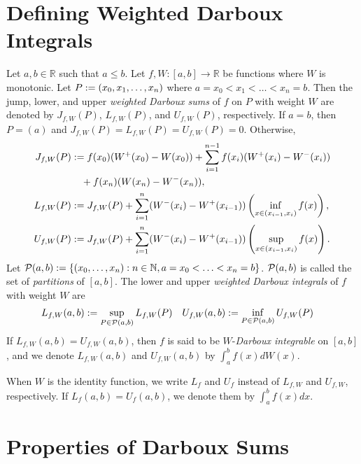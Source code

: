 \documentclass[a4paper,12pt,fleqn]{article}
\begin{document}
\section{Defining Weighted Darboux Integrals}

\begin{definition}
\label{defn:darboux-integral}
Let $a, b \in \mathbb{R}$ such that $a \le b$.
Let $f, W: [a, b] \to \mathbb{R}$ be functions where $W$ is monotonic.
Let $P := (x_0, x_1, \ldots, x_n)$ where $a = x_0 < x_1 < \ldots < x_n = b$.
Then the jump, lower, and upper \emph{weighted Darboux sums} of $f$ on $P$ with weight $W$
are denoted by $J_{f,W}(P)$, $L_{f,W}(P)$, and $U_{f,W}(P)$, respectively.
If $a = b$, then $P = (a)$ and $J_{f,W}(P) = L_{f,W}(P) = U_{f,W}(P) = 0$. Otherwise,
\begin{align*}
J_{f,W}(P) &:= f(x_0)(W^+(x_0) - W(x_0))
    + \sum_{i=1}^{n-1} f(x_i)(W^+(x_i) - W^-(x_i))
    \\ &\quad + f(x_n)(W(x_n) - W^-(x_n)),
\\ L_{f,W}(P) &:= J_{f,W}(P)
    + \sum_{i=1}^n (W^-(x_i) - W^+(x_{i-1}))\left(\inf_{x \in (x_{i-1}, x_i)} f(x)\right),
\\ U_{f,W}(P) &:= J_{f,W}(P)
    + \sum_{i=1}^n (W^-(x_i) - W^+(x_{i-1}))\left(\sup_{x \in (x_{i-1}, x_i)} f(x)\right).
\end{align*}
Let $\mathcal{P}(a, b) := \{(x_0, \ldots, x_n): n \in \mathbb{N}, a = x_0 < \ldots < x_n = b\}$.
$\mathcal{P}(a, b)$ is called the set of \emph{partitions} of $[a, b]$.
The lower and upper \emph{weighted Darboux integrals} of $f$ with weight $W$ are
\begin{align*}
L_{f,W}(a, b) &:= \sup_{P \in \mathcal{P}(a, b)} L_{f,W}(P)
& U_{f,W}(a, b) &:= \inf_{P \in \mathcal{P}(a, b)} U_{f,W}(P)
\end{align*}
If $L_{f,W}(a, b) = U_{f,W}(a, b)$, then $f$ is said to be
$W$-\emph{Darboux integrable} on $[a, b]$,
and we denote $L_{f,W}(a, b)$ and $U_{f,W}(a, b)$ by $\int_a^b f(x)dW(x)$.

When $W$ is the identity function, we write $L_f$ and $U_f$
instead of $L_{f,W}$ and $U_{f,W}$, respectively.
If $L_f(a, b) = U_f(a, b)$, we denote them by $\int_a^b f(x)dx$.
\end{definition}

\section{Properties of Darboux Sums}
\end{document}
